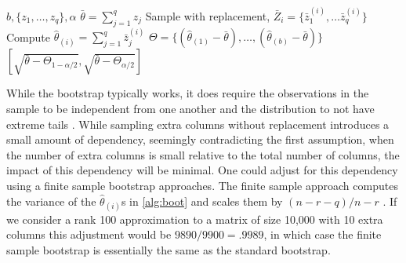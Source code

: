 \documentclass[11pt]{article}
\begin{document}
\begin{algorithm}
    \caption{Bootstrap Error Confidence Interval} \label{alg:boot}
    \begin{algorithmic}[1]
        \Require $b, \{z_1, \dots, z_q\}, \alpha$
        \State $ \bar\theta = { \sum_{j=1}^q z_j}$
        \State Sample with replacement,
        $\bar Z_i = \{\bar z_1^{(i)}, \dots \bar z_q^{(i)}\}$
        \State Compute $\hat \theta_{(i)} = \sum_{j=1}^q \bar z_j^{(i)}$
        \EndFor
        \State $\Theta= \{(\hat \theta_{(1)} - \bar \theta), \dots, (\hat \theta_{(b)} - \bar \theta)\}$\\
        \Return $[\sqrt{\bar \theta - \Theta_{1-\alpha/2}}, \sqrt{\bar \theta - \Theta_{\alpha/2}}]$
    \end{algorithmic}
\end{algorithm}


While the bootstrap typically works, it does require the observations in the sample to be independent from one another and the distribution to not have extreme tails \cite{wasserman2008all}.
While sampling extra columns without replacement introduces a small amount of dependency, seemingly contradicting the first assumption, when the number of extra columns is small relative to the total number of columns, the impact of this dependency will be minimal. One could adjust for this dependency using a finite sample bootstrap approaches\cite{mccarthy1985bootstrap}. The finite sample approach computes the variance of the $\hat{\theta}_{(i)}$s in \cref{alg:boot} and scales them by $(n-r - q) / n-r$ \cite{rao1988resampling}. If we consider a rank 100 approximation to a matrix of size 10,000 with 10 extra columns this adjustment would be $9890/9900 = .9989$, in which case the finite sample bootstrap is essentially the same as the standard bootstrap.
\end{document}
